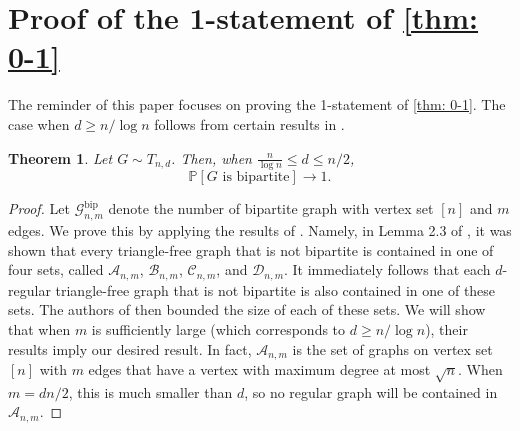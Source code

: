 \documentclass[11pt]{article}
\def\P{\mathbb P}
\theoremstyle{plain}
\newtheorem{thm}{Theorem}[section]
\begin{document}
\section{Proof of the 1-statement of \cref{thm: 0-1}}\label{sec: one}

The reminder of this paper focuses on proving the 1-statement of \cref{thm: 0-1}. The case when $d \geq n/\log n$ follows from certain results in \cite{Promel1996Structure}. 
\begin{thm}\label{thm: linear d}
    Let $G \sim T_{n,d}$. Then, when $\frac{n}{\log n} \leq d \leq n/2$, 
    \[
    \P[G \text{ is bipartite}] \rightarrow 1.
    \]
\end{thm}
\begin{proof}
    Let $\mathcal G_{n,m}^{\text{bip}}$ denote the number of bipartite graph with vertex set $[n]$ and $m$ edges. We prove this by applying the results of \cite{Promel1996Structure}. Namely, in Lemma 2.3 of \cite{Promel1996Structure}, it was shown that every triangle-free graph that is not bipartite is contained in one of four sets, called $\mathcal A_{n,m}$, $\mathcal B_{n,m}$, $\mathcal C_{n,m}$, and $\mathcal D_{n,m}$. It immediately follows that each $d$-regular triangle-free graph that is not bipartite is also contained in one of these sets. The authors of \cite{Promel1996Structure} then bounded the size of each of these sets. We will show that when $m$ is sufficiently large (which corresponds to $d\geq n/\log n$), their results imply our desired result. In fact, $\mathcal A_{n,m}$ is the set of graphs on vertex set $[n]$ with $m$ edges that have a vertex with maximum degree at most $\sqrt n$. When $m = dn/2$, this is much smaller than $d$, so no regular graph will be contained in $\mathcal A_{n,m}$.
    

\end{proof}
\end{document}
